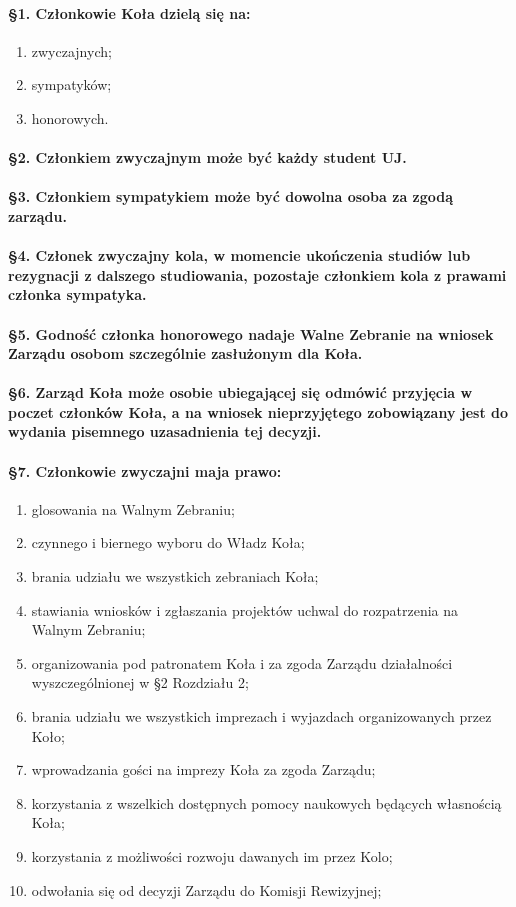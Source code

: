 \documentclass{article}
\begin{document}
\paragraph{\S 1. Członkowie Koła dzielą się na:}
\begin{enumerate}
			\item zwyczajnych;
			\item sympatyków;
			\item honorowych.
		\end{enumerate}
\paragraph{\S 2. Członkiem zwyczajnym może być każdy student UJ. }
\paragraph{\S 3. Członkiem sympatykiem może być dowolna osoba za zgodą zarządu.}
\paragraph{\S 4. Członek zwyczajny kola, w momencie ukończenia studiów lub rezygnacji z dalszego studiowania, pozostaje członkiem kola z prawami członka sympatyka. }
\paragraph{\S 5. Godność członka honorowego nadaje Walne Zebranie na wniosek Zarządu osobom szczególnie zasłużonym dla Koła.}
\paragraph{\S 6. Zarząd Koła może osobie ubiegającej się odmówić przyjęcia w poczet członków Koła, a na
wniosek nieprzyjętego zobowiązany jest do wydania pisemnego uzasadnienia tej decyzji.}
\paragraph{\S 7. Członkowie zwyczajni maja prawo:}
\begin{enumerate}
			\item glosowania na Walnym Zebraniu;
			\item czynnego i biernego wyboru do Władz Koła;
			\item brania udziału we wszystkich zebraniach Koła;
			\item stawiania wniosków i zgłaszania projektów uchwal do rozpatrzenia na Walnym Zebraniu;
			\item organizowania pod patronatem Koła i za zgoda Zarządu działalności wyszczególnionej w §2 Rozdziału 2;
			\item brania udziału we wszystkich imprezach i wyjazdach organizowanych przez Koło;
			\item wprowadzania gości na imprezy Koła za zgoda Zarządu;
			\item korzystania z wszelkich dostępnych pomocy naukowych będących własnością Koła;
			\item korzystania z możliwości rozwoju dawanych im przez Kolo;
			\item odwołania się od decyzji Zarządu do Komisji Rewizyjnej;
		\end{enumerate}
\end{document}
